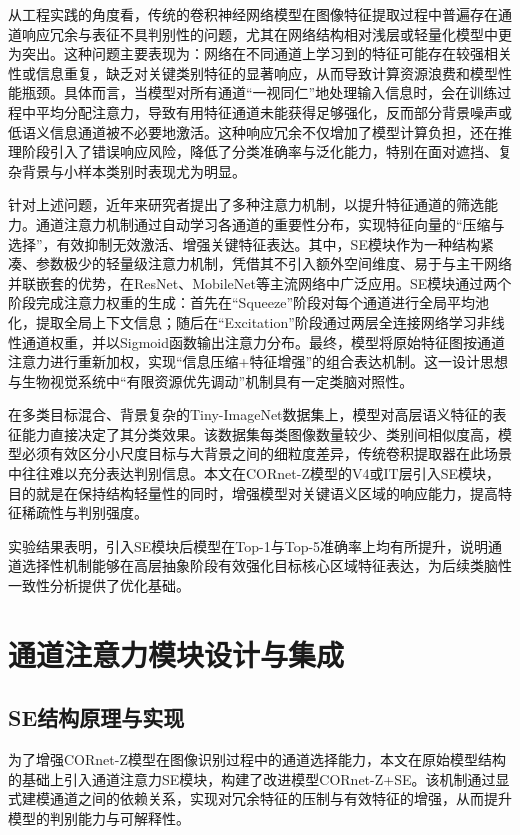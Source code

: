 从工程实践的角度看，传统的卷积神经网络模型在图像特征提取过程中普遍存在通道响应冗余与表征不具判别性的问题，尤其在网络结构相对浅层或轻量化模型中更为突出。这种问题主要表现为：网络在不同通道上学习到的特征可能存在较强相关性或信息重复，缺乏对关键类别特征的显著响应，从而导致计算资源浪费和模型性能瓶颈\cite{he2016deep}。具体而言，当模型对所有通道“一视同仁”地处理输入信息时，会在训练过程中平均分配注意力，导致有用特征通道未能获得足够强化，反而部分背景噪声或低语义信息通道被不必要地激活。这种响应冗余不仅增加了模型计算负担，还在推理阶段引入了错误响应风险，降低了分类准确率与泛化能力，特别在面对遮挡、复杂背景与小样本类别时表现尤为明显\cite{wang2020eca}。

针对上述问题，近年来研究者提出了多种注意力机制，以提升特征通道的筛选能力。通道注意力机制通过自动学习各通道的重要性分布，实现特征向量的“压缩与选择”，有效抑制无效激活、增强关键特征表达。其中，SE模块作为一种结构紧凑、参数极少的轻量级注意力机制，凭借其不引入额外空间维度、易于与主干网络并联嵌套的优势，在ResNet、MobileNet等主流网络中广泛应用\cite{hu2018squeeze}。SE模块通过两个阶段完成注意力权重的生成：首先在“Squeeze”阶段对每个通道进行全局平均池化，提取全局上下文信息；随后在“Excitation”阶段通过两层全连接网络学习非线性通道权重，并以Sigmoid函数输出注意力分布。最终，模型将原始特征图按通道注意力进行重新加权，实现“信息压缩+特征增强”的组合表达机制。这一设计思想与生物视觉系统中“有限资源优先调动”机制具有一定类脑对照性。

在多类目标混合、背景复杂的Tiny-ImageNet数据集上，模型对高层语义特征的表征能力直接决定了其分类效果。该数据集每类图像数量较少、类别间相似度高，模型必须有效区分小尺度目标与大背景之间的细粒度差异，传统卷积提取器在此场景中往往难以充分表达判别信息。本文在CORnet-Z模型的V4或IT层引入SE模块，目的就是在保持结构轻量性的同时，增强模型对关键语义区域的响应能力，提高特征稀疏性与判别强度。

实验结果表明，引入SE模块后模型在Top-1与Top-5准确率上均有所提升，说明通道选择性机制能够在高层抽象阶段有效强化目标核心区域特征表达，为后续类脑性一致性分析提供了优化基础。

\section{通道注意力模块设计与集成}

\subsection{SE结构原理与实现}

为了增强CORnet-Z模型在图像识别过程中的通道选择能力，本文在原始模型结构的基础上引入通道注意力SE模块，构建了改进模型CORnet-Z+SE。该机制通过显式建模通道之间的依赖关系，实现对冗余特征的压制与有效特征的增强，从而提升模型的判别能力与可解释性。

